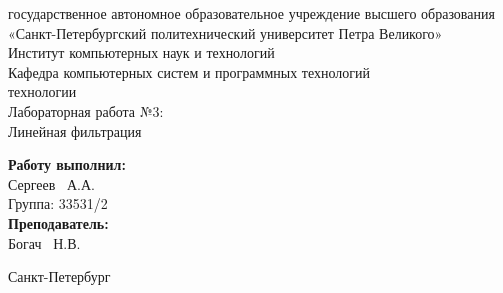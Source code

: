 \documentclass[a4paper]{article}
\begin{document}

\begin{titlepage}	%

	\begin{center}		%

		 государственное автономное образовательное учреждение высшего образования «Санкт-Петербургский политехнический университет Петра Великого» \\
		\large Институт компьютерных наук и технологий \\
		\large Кафедра компьютерных систем и программных технологий\\[2cm]
		
	    \vfill
		 технологии\\[0.5cm] %
		\large Лабораторная работа №3:\\
		Линейная фильтрация\\[4.8cm]

	\end{center}

	\begin{flushright} %
		\begin{minipage}{0.25\textwidth} %
			\begin{flushleft} %

				\large\textbf{Работу выполнил:}\\
				\large Сергеев ~А.А.\\
				\large {Группа:} 33531/2\\
				
				\large \textbf{Преподаватель:}\\
				\large Богач ~Н.В.\\

			\end{flushleft}
		\end{minipage}
	\end{flushright}
	
	\vfill %

	\begin{center}
	\large Санкт-Петербург\\
	\large \the\year %
	\end{center} %

\thispagestyle{empty} %
\end{titlepage} %
\vfill %
\end{document}
